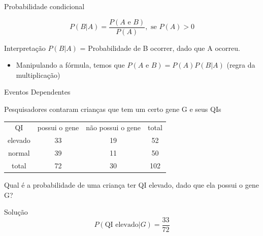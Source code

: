 \documentclass{beamer}
\begin{document}
\begin{frame}{Probabilidade condicional}
  \begin{definition}
    \begin{displaymath}
      P(B|A) = \frac{P(A \text{ e } B)}{P(A)}, \text{ se } P(A)>0
    \end{displaymath}
  \end{definition}
  \begin{block}{Interpretação}
    $P(B|A)$ = Probabilidade de B ocorrer, \alert{dado que} A ocorreu.
  \end{block}
  \begin{itemize}
  \item Manipulando a fórmula, temos que $P(A \text{ e } B) =
    P(A)P(B|A)$ (regra da multiplicação)
  \end{itemize}
\end{frame}

\begin{frame}{Eventos Dependentes}
  \begin{example}
    Pesquisadores contaram crianças que tem um certo gene G e seus QIs

    \begin{tabular}{ccc|c}
      QI & possui o gene & não possui o gene & total\\
      elevado & 33 & 19 & 52\\
      normal & 39 & 11 & 50\\
      \hline
      total & 72 & 30 & 102\\
    \end{tabular}

    Qual é a probabilidade de uma criança ter QI elevado, dado que ela
    possui o gene G?
  \end{example}
  \begin{block}{Solução}
    \begin{displaymath}
      P(\text{QI elevado}| G) = \frac{33}{72}
    \end{displaymath}
  \end{block}
\end{frame}

\end{document}
